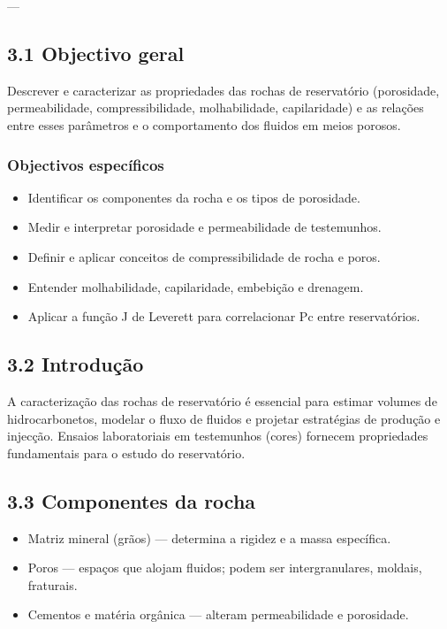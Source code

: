 \documentclass[11pt,a4paper]{article}
\begin{document}
---

\subsection{3.1 Objectivo geral}
Descrever e caracterizar as propriedades das rochas de reservatório (porosidade, permeabilidade, compressibilidade, molhabilidade, capilaridade) e as relações entre esses parâmetros e o comportamento dos fluidos em meios porosos.

\subsubsection{Objectivos específicos}
\begin{itemize}
\item Identificar os componentes da rocha e os tipos de porosidade.
\item Medir e interpretar porosidade e permeabilidade de testemunhos.
\item Definir e aplicar conceitos de compressibilidade de rocha e poros.
\item Entender molhabilidade, capilaridade, embebição e drenagem.
\item Aplicar a função J de Leverett para correlacionar Pc entre reservatórios.
\end{itemize}

\subsection{3.2 Introdução}
A caracterização das rochas de reservatório é essencial para estimar volumes de hidrocarbonetos, modelar o fluxo de fluidos e projetar estratégias de produção e injecção. Ensaios laboratoriais em testemunhos (cores) fornecem propriedades fundamentais para o estudo do reservatório.

\subsection{3.3 Componentes da rocha}
\begin{itemize}
\item Matriz mineral (grãos) — determina a rigidez e a massa específica.
\item Poros — espaços que alojam fluidos; podem ser intergranulares, moldais, fraturais.
\item Cementos e matéria orgânica — alteram permeabilidade e porosidade.
\end{itemize}
\end{document}
